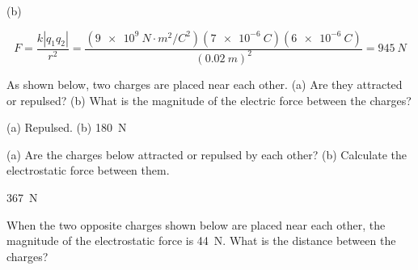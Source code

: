 \documentclass[answers]{exam}
\begin{document}
\begin{questions}
\begin{solution}
(b)

\begin{equation*}
    F = \frac{k \left|q_1 q_2\right|}{r^2} = \frac{\left(\SI{9e9}{N\cdot m^2/C^2}\right)(\SI{7e-6}{C})(\SI{6e-6}{C})}{\left(\SI{0.02}{m}\right)^2} = \boxed{\SI{945}{N}}
\end{equation*}
\end{solution}


\question \label{mJu5SD}
As shown below, two charges are placed near each other. (a) Are they attracted or repulsed? (b) What is the magnitude of the electric force between the charges?

\begin{center}
\end{center}


\begin{solution}
(a) Repulsed. (b) \SI{180}{N}
\end{solution}


\question \label{NqU30G}
(a) Are the charges below attracted or repulsed by each other? (b) Calculate the electrostatic force between them.

\begin{center}
\end{center}


\begin{solution}
\SI{367}{N}
\end{solution}


\question \label{S2QW5m}
When the two opposite charges shown below are placed near each other, the magnitude of the electrostatic force is \SI{44}{N}. What is the distance between the charges?

\begin{center}
\end{center}




\end{questions}
\end{document}
